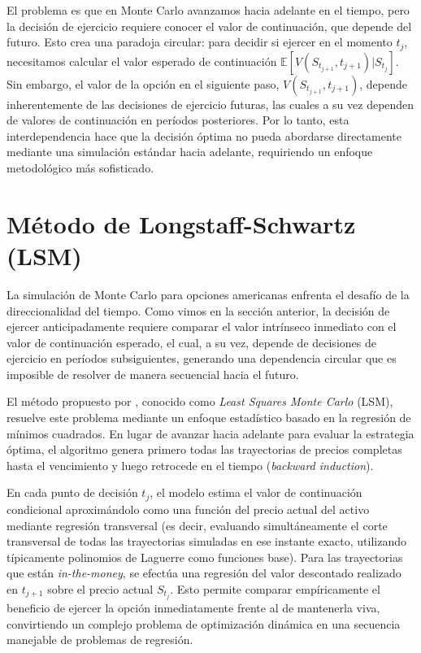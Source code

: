 El problema es que en Monte Carlo avanzamos hacia adelante en el tiempo, pero la decisión de ejercicio requiere conocer el valor de continuación, que depende del futuro. Esto crea una paradoja circular: para decidir si ejercer en el momento $t_j$, necesitamos calcular el valor esperado de continuación $\mathbb{E}[V(S_{t_{j+1}}, t_{j+1}) | S_{t_j}]$. Sin embargo, el valor de la opción en el siguiente paso, $V(S_{t_{j+1}}, t_{j+1})$, depende inherentemente de las decisiones de ejercicio futuras, las cuales a su vez dependen de valores de continuación en períodos posteriores. Por lo tanto, esta interdependencia hace que la decisión óptima no pueda abordarse directamente mediante una simulación estándar hacia adelante, requiriendo un enfoque metodológico más sofisticado.

\section{Método de Longstaff-Schwartz (LSM)}

La simulación de Monte Carlo para opciones americanas enfrenta el desafío de la direccionalidad del tiempo. Como vimos en la sección anterior, la decisión de ejercer anticipadamente requiere comparar el valor intrínseco inmediato con el valor de continuación esperado, el cual, a su vez, depende de decisiones de ejercicio en períodos subsiguientes, generando una dependencia circular que es imposible de resolver de manera secuencial hacia el futuro.

El método propuesto por \cite{longstaff2001valuing}, conocido como \textit{Least Squares Monte Carlo} (LSM), resuelve este problema mediante un enfoque estadístico basado en la regresión de mínimos cuadrados. En lugar de avanzar hacia adelante para evaluar la estrategia óptima, el algoritmo genera primero todas las trayectorias de precios completas hasta el vencimiento y luego retrocede en el tiempo (\textit{backward induction}).

En cada punto de decisión $t_j$, el modelo estima el valor de continuación condicional aproximándolo como una función del precio actual del activo mediante regresión transversal (es decir, evaluando simultáneamente el corte transversal de todas las trayectorias simuladas en ese instante exacto, utilizando típicamente polinomios de Laguerre como funciones base). Para las trayectorias que están \textit{in-the-money}, se efectúa una regresión del valor descontado realizado en $t_{j+1}$ sobre el precio actual $S_{t_j}$. Esto permite comparar empíricamente el beneficio de ejercer la opción inmediatamente frente al de mantenerla viva, convirtiendo un complejo problema de optimización dinámica en una secuencia manejable de problemas de regresión.

